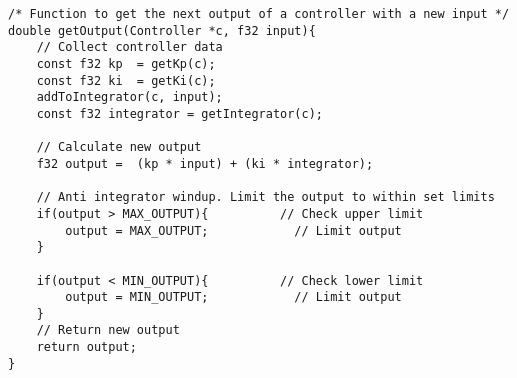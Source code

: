 \begin{lstlisting}[style=c, caption=Implementation of PI-controller 'get output'-function., label=code:pi_controller3]
/* Function to get the next output of a controller with a new input */
double getOutput(Controller *c, f32 input){
	// Collect controller data
	const f32 kp  = getKp(c);
	const f32 ki  = getKi(c);
	addToIntegrator(c, input);
	const f32 integrator = getIntegrator(c);

	// Calculate new output
	f32 output =  (kp * input) + (ki * integrator);

	// Anti integrator windup. Limit the output to within set limits
	if(output > MAX_OUTPUT){          // Check upper limit
		output = MAX_OUTPUT;            // Limit output
	}
	
	if(output < MIN_OUTPUT){          // Check lower limit
		output = MIN_OUTPUT;            // Limit output
	}	
	// Return new output
	return output;
}
\end{lstlisting}

